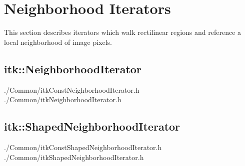 \section{Neighborhood Iterators}
\label{sec:NeighborhoodIterators}
This section describes iterators which walk rectilinear regions and reference a
local neighborhood of image pixels.




\subsection{itk::NeighborhoodIterator}
\label{sec:itkNeighborhoodIterator}
./Common/itkConstNeighborhoodIterator.h
./Common/itkNeighborhoodIterator.h

\subsection{itk::ShapedNeighborhoodIterator}
\label{sec:itkShapedNeighborhoodIterator}
./Common/itkConstShapedNeighborhoodIterator.h
./Common/itkShapedNeighborhoodIterator.h



